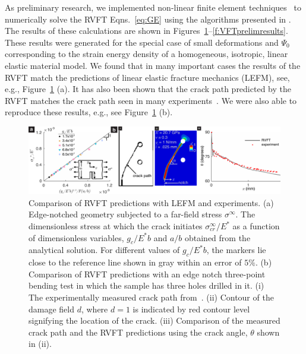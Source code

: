 \documentclass[10pt,letterpaper]{article}
\begin{document}
    As preliminary research, we implemented non-linear finite element techniques~\cite{belytschko2013nonlinear} to
    numerically solve the RVFT Eqns.~\eqref{eq:GE} using the algorithms presented in \cite{borden2012phase}.
    The results of these calculations are shown in Figures~\ref{f:VFTvalidation}--\ref{f:VFTprelimresults}.
    These results were generated for the special case of small deformations and $\Psi_0$ corresponding to the strain energy density of a homogeneous, isotropic, linear elastic material model.
    We found that in many important cases the results of the RVFT match the predictions of linear elastic fracture mechanics (LEFM), see, e.g.,  Figure~\ref{f:VFTvalidation} (a).
    It has also been shown that the crack path predicted by the RVFT matches the crack path seen in many experiments~\cite{miehe2010phase,borden2012phase,dally2015phase}.
    We were also able to reproduce these results, e.g., see Figure~\ref{f:VFTvalidation} (b).

    \begin{figure}[t!]
      \centering
      \includegraphics[width=\textwidth]{Figures/VRF/Figure1_box_ver9.pdf}
      \caption{\footnotesize Comparison of RVFT predictions with LEFM and experiments. (a) Edge-notched geometry subjected to a far-field stress $\sigma^\infty$. The dimensionless stress at which the crack initiates $\sigma^\infty_{cr}/E^*$ as a function of dimensionless variables, $g_c/E^*b$ and $a/b$ obtained from the analytical solution. For different values of $g_c/E^*b$, the markers lie close to the reference line shown in gray within an error of $5\%$. (b) Comparison of RVFT predictions with an edge notch three-point bending test in which the sample has three holes drilled in it. (i) The experimentally measured crack path from~\cite{bittencourt_1996}. (ii) Contour of the damage field $d$, where $d=1$ is indicated by red contour level signifying the location of the crack. (iii) Comparison of the measured crack path and the RVFT predictions using the crack angle, $\theta$ shown in (ii).}
      \label{f:VFTvalidation}
    \end{figure}
\end{document}
